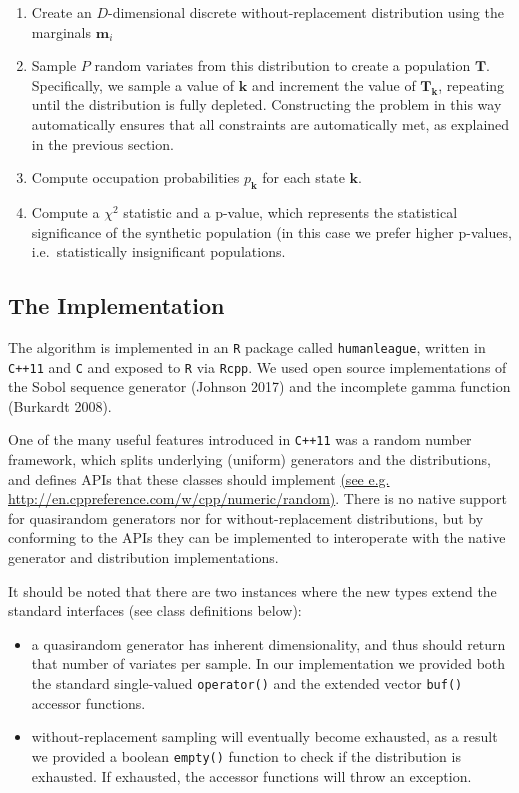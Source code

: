 \documentclass[]{article}
\begin{document}
\begin{enumerate}
\def\labelenumi{\arabic{enumi}.}
\item
  Create an \(D\)-dimensional discrete without-replacement distribution
  using the marginals \(\mathbf{m}_i\)
\item
  Sample \(P\) random variates from this distribution to create a
  population \(\mathbf{T}\). Specifically, we sample a value of
  \(\mathbf{k}\) and increment the value of \(\mathbf{T}_\mathbf{k}\),
  repeating until the distribution is fully depleted. Constructing the
  problem in this way automatically ensures that all constraints are
  automatically met, as explained in the previous section.
\item
  Compute occupation probabilities \(p_\mathbf{k}\) for each state
  \(\mathbf{k}\).
\item
  Compute a \(\chi^2\) statistic and a p-value, which represents the
  statistical significance of the synthetic population (in this case we
  prefer higher p-values, i.e.~statistically insignificant populations.
\end{enumerate}

\subsection{The Implementation}\label{the-implementation}

The algorithm is implemented in an \texttt{R} package called
\texttt{humanleague}, written in \texttt{C++11} and \texttt{C} and
exposed to \texttt{R} via \texttt{Rcpp}. We used open source
implementations of the Sobol sequence generator (Johnson 2017) and the
incomplete gamma function (Burkardt 2008).

One of the many useful features introduced in \texttt{C++11} was a
random number framework, which splits underlying (uniform) generators
and the distributions, and defines APIs that these classes should
implement \href{http://en.cppreference.com/w/cpp/numeric/random}{(see
e.g. http://en.cppreference.com/w/cpp/numeric/random)}. There is no
native support for quasirandom generators nor for without-replacement
distributions, but by conforming to the APIs they can be implemented to
interoperate with the native generator and distribution implementations.

It should be noted that there are two instances where the new types
extend the standard interfaces (see class definitions below):

\begin{itemize}
\item
  a quasirandom generator has inherent dimensionality, and thus should
  return that number of variates per sample. In our implementation we
  provided both the standard single-valued \texttt{operator()} and the
  extended vector \texttt{buf()} accessor functions.
\item
  without-replacement sampling will eventually become exhausted, as a
  result we provided a boolean \texttt{empty()} function to check if the
  distribution is exhausted. If exhausted, the accessor functions will
  throw an exception.
\end{itemize}
\end{document}
